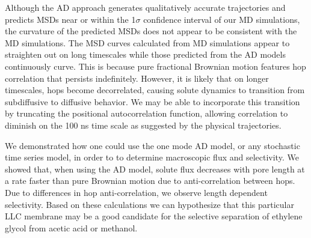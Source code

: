 \documentclass[journal=jctcce,manuscript=article]{achemso}
\begin{document}
  Although the AD approach generates qualitatively accurate trajectories and
  predicts MSDs near or within the 1$\sigma$ confidence interval of our MD
  simulations, the curvature of the predicted MSDs does not appear to be
  consistent with the MD simulations. The MSD curves calculated from MD
  simulations appear to straighten out on long timescales while those predicted
  from the AD models continuously curve. This is because pure fractional Brownian motion
  features hop correlation that persists indefinitely.
  However, it is likely that on longer timescales, hops become decorrelated, 
  causing solute dynamics to transition from subdiffusive to diffusive behavior.
  We may be able to incorporate this transition by truncating the positional 
  autocorrelation function, allowing correlation to diminish on the 100 ns 
  time scale as suggested by the physical trajectories.

  We demonstrated how one could use the one mode AD model,
  or any stochastic time series model,
  in order to to
  determine macroscopic flux and selectivity. We showed that, when using the AD
  model, solute flux decreases with pore length at a rate faster than pure
  Brownian motion due to anti-correlation between hops.
  Due to differences in hop anti-correlation, we observe length dependent
  selectivity. Based on these calculations we can hypothesize that this
  particular LLC membrane may be a good candidate for the selective separation
  of ethylene glycol from acetic acid or methanol.

  
\end{document}
